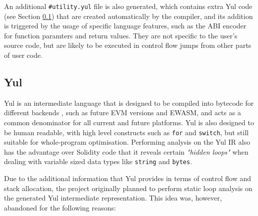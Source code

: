 An additional \texttt{\#utility.yul} file is also generated, which contains extra Yul code (see Section \ref{section:Yul}) that are
created automatically by the compiler, and its addition is triggered by the usage of
specific language features, such as the ABI encoder for function paramters and return values.
They are not specific to the user's source code, but are likely to be executed in control flow
jumps from other parts of user code.


\subsection{Yul}
\label{section:Yul}

Yul is an intermediate language that is designed to be compiled into bytecode for different
backends \cite{solcyul}, such as future EVM versions and EWASM, and acts as a common denominator
for all current and future platforms. Yul is also designed to be human readable, with high level constructs
such as \texttt{for} and \texttt{switch}, but still suitable for whole-program optimisation. Performing 
analysis on the Yul IR also has the advantage over Solidity code that it 
reveals certain \textit{"hidden loops"} when dealing with variable sized data types 
like \texttt{string} and \texttt{bytes}. 

Due to the additional information that Yul provides in terms of control flow and stack allocation,
the project originally planned to perform static loop analysis on the generated Yul intermediate
representation. This idea was, however, abandoned for the following reasons:

